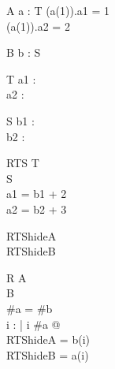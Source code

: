 \begin{schema}{A}
a : \seq T
\where
(a(1)).a1 = 1\\
(a(1)).a2 = 2
\end{schema}

\begin{schema}{B}
b : \seq S
\end{schema}

\begin{schema}{T}
a1 : \nat\\
a2 : \nat
\end{schema}

\begin{schema}{S}
b1 : \nat\\
b2 : \nat
\end{schema}

\begin{schema}{RTS}
T\\
S\\
\where
a1 = b1 + 2\\
a2 = b2 + 3
\end{schema}

\begin{zed}
RTShideA \\
RTShideB 
\end{zed}

%


\begin{schema}{R}
A\\
B\\
\where
\#a = \#b\\
\forall i : \nat | i \leq \#a @ \\
      \theta RTShideA = b(i) \land\\
      \theta RTShideB = a(i)
\end{schema}
